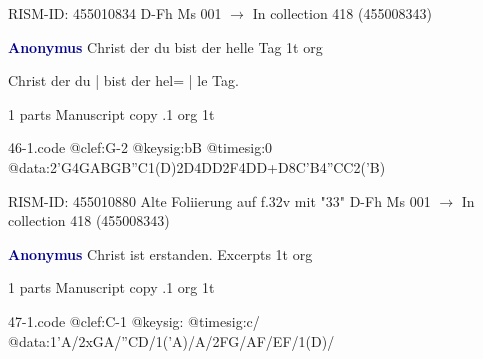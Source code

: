 \documentclass[twocolumn]{book}
\begin{document}
\newline RISM-ID: 455010834
\newline D-Fh  Ms 001
\newline $\rightarrow$ In collection 418 (455008343)

\newline \par \vspace{7pt} \textcolor{darkblue}{\textbf{Anonymus  }}
\newline Christ der du bist der helle Tag  1t  
\newline org
\newline \begin{itshape}[f.32v, at left:] Christ der du | bist der hel= | le Tag.\end{itshape} 
\newline \textcolor{darkblue}{}  1 parts  
\newline Manuscript copy
.1  org  1t  
\begin{filecontents*}{46-1.code}
@clef:G-2
@keysig:bB
@timesig:0
@data:2'G4GABGB''C1(D)2D4DD2F4DD+D{8C'B}4''CC2('B)
\end{filecontents*}
\newline
%

\newline RISM-ID: 455010880
\newline Alte Foliierung auf f.32v mit "33"
\newline D-Fh  Ms 001
\newline $\rightarrow$ In collection 418 (455008343)

\newline \par \vspace{7pt} \textcolor{darkblue}{\textbf{Anonymus  }}
\newline Christ ist erstanden. Excerpts  1t  
\newline org
\newline \begin{itshape}\end{itshape} 
\newline \textcolor{darkblue}{}  1 parts  
\newline Manuscript copy
.1  org  1t
\newline \begin{footnotesize}  \end{footnotesize}  
\begin{filecontents*}{47-1.code}
@clef:C-1
@keysig:
@timesig:c/
@data:1'A/2xGA/''CD/1('A)/A/2FG/AF/EF/1(D)/
\end{filecontents*}
\newline
%
\end{document}
